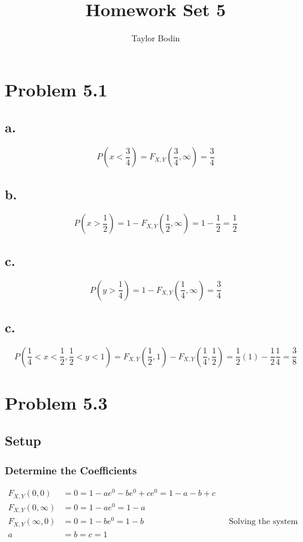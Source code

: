 \documentclass[12pt]{article}
\begin{document}
\title{Homework Set 5}
\author{Taylor Bodin}
\maketitle

\section*{Problem 5.1}
\subsection*{a.}
\[P(x<\frac{3}{4}) = F_{X,Y}(\frac{3}{4},\infty) = \frac{3}{4} \]

\subsection*{b.}
\[P(x>\frac{1}{2}) = 1 - F_{X,Y}(\frac{1}{2},\infty) = 1 - \frac{1}{2} = \frac{1}{2} \]

\subsection*{c.}
\[P(y>\frac{1}{4}) = 1 - F_{X,Y}(\frac{1}{4},\infty) = \frac{3}{4} \]

\subsection*{c.}
\[P(\frac{1}{4}<x<\frac{1}{2},\frac{1}{2}<y<1) = F_{X,Y}(\frac{1}{2},1)-F_{X,Y}(\frac{1}{4},\frac{1}{2}) 
= \frac{1}{2}(1)-\frac{1}{2}\frac{1}{4} = \frac{3}{8} \]

\section*{Problem 5.3}
\subsection*{Setup}
\subsubsection*{Determine the Coefficients}
\begin{align*}
F_{X,Y}(0,0) &= 0 = 1 - ae^0 - be^0 + ce^0 = 1 - a - b + c \\
F_{X,Y}(0,\infty) &= 0 = 1 - ae^0 = 1 - a  \\
F_{X,Y}(\infty,0) &= 0 = 1 - be^0 = 1 - b & & \textrm{Solving the system yields} \\
a &= b = c = 1
\end{align*}
\end{document}

